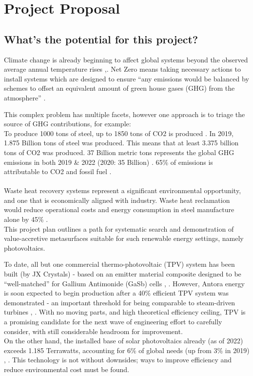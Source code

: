 \chapter{Project Proposal}

\section{What’s the potential for this project?}

Climate change is already beginning to affect global systems beyond the observed average annual temperature rises \cite{ipcc2021},\cite{nrdc2023effects}.
    Net Zero means taking necessary actions to install systems which are designed to ensure “any emissions would be balanced by schemes to offset an equivalent amount of green house gases (GHG) from the atmosphere”
\cite{ukgov2023}.

This complex problem has multiple facets, however one approach is to triage the source of GHG contributions, for example:
\\
To produce 1000 tons of steel, up to 1850 tons of CO2 is produced \cite{mckinsey2020decarbonization}. 
In 2019, 1.875 Billion tons of steel was produced. This means that at least 3.375 billion tons of CO2 was produced. 37 Billion metric tons represents the global GHG emissions in both 2019 \& 2022 (2020: 35 Billion) \cite{hausfather2022global}. 65\% of emissions is attributable to CO2 and fossil fuel \cite{Jones2023CO2}.
\\
\\
Waste heat recovery systems represent a significant environmental opportunity, and one that is economically aligned with industry. Waste heat reclamation would reduce operational costs and energy consumption in steel manufacture alone by 45\% \cite{doe2008wasteheat}. 
\\
This project plan outlines a path for systematic search and demonstration of value-accretive metasurfaces suitable for such renewable energy settings, namely photovoltaics.

To date, all but one commercial thermo-photovoltaic (TPV) system has been built (by JX Crystals) - based on an emitter material composite designed to be ``well-matched'' for Gallium Antimonide (GaSb) cells \cite{ferguson_matched_1997}, \cite{fraas2002thermophotovoltaics}. However, Antora energy is soon expected to begin production after a 40\% efficient TPV system was demonstrated - an important threshold for being comparable to steam-driven turbines \cite{thermophotovoltaic2022efficiency}, \cite{pv_magazine_2023_thermophotovoltaic}. With no moving parts, and high theoretical efficiency ceiling, TPV is a promising candidate for the next wave of engineering effort to carefully consider, with still considerable headroom for improvement.
\\
On the other hand, the installed base of solar photovoltaics already (as of 2022) exceeds 1.185 Terrawatts, accounting for 6\% of global needs (up from 3\% in 2019) \cite{ieapvps2023}, \cite{ieapvps2020}. This technology is not without downsides; ways to improve efficiency and reduce environmental cost must be found.

